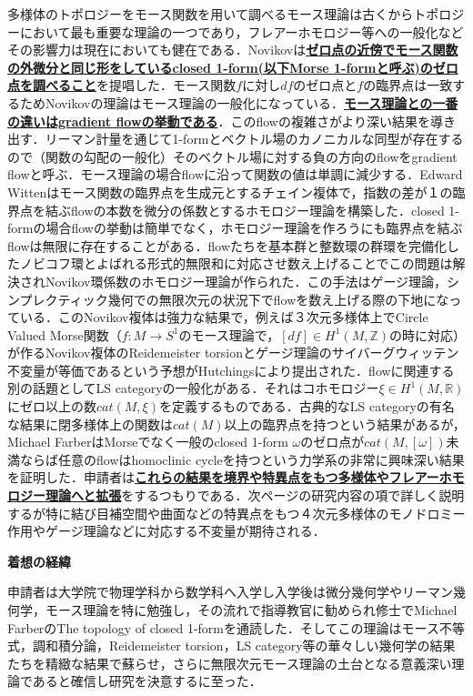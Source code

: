\documentclass[11pt,a4j,dvipdfmx]{jarticle} 					%
\newcommand{\研究課題名}{象の卵}
\newcommand{\研究機関名}{京都大学}
\newcommand{\研究代表者氏名}{福士謙二}
\begin{document}
	多様体のトポロジーをモース関数を用いて調べるモース理論は古くからトポロジーにおいて最も重要な理論の一つであり，フレアーホモロジー等への一般化などその影響力は現在においても健在である．Novikovは\textbf{\ul{ゼロ点の近傍でモース関数の外微分と同じ形をしているclosed 1-form(以下Morse 1-formと呼ぶ)のゼロ点を調べること}}を提唱した．モース関数$f$に対し$df$のゼロ点と$f$の臨界点は一致するためNovikovの理論はモース理論の一般化になっている．\textbf{\ul{モース理論との一番の違いはgradient flowの挙動である}}．このflowの複雑さがより深い結果を導き出す．リーマン計量を通じて1-formとベクトル場のカノニカルな同型が存在するので（関数の勾配の一般化）そのベクトル場に対する負の方向のflowをgradient flowと呼ぶ．モース理論の場合flowに沿って関数の値は単調に減少する．Edward Wittenはモース関数の臨界点を生成元とするチェイン複体で，指数の差が１の臨界点を結ぶflowの本数を微分の係数とするホモロジー理論を構築した．closed 1-formの場合flowの挙動は簡単でなく，ホモロジー理論を作ろうにも臨界点を結ぶflowは無限に存在することがある．flowたちを基本群と整数環の群環を完備化したノビコフ環とよばれる形式的無限和に対応させ数え上げることでこの問題は解決されNovikov環係数のホモロジー理論が作られた．この手法はゲージ理論，シンプレクティック幾何での無限次元の状況下でflowを数え上げる際の下地になっている．このNovikov複体は強力な結果で，例えば３次元多様体上でCircle Valued Morse関数$（f:M \rightarrow S^1$のモース理論で，$[df]\in H^1(M,\mathbb{Z})$の時に対応）が作るNovikov複体のReidemeister torsionとゲージ理論のサイバーグウィッテン不変量が等価であるという予想がHutchingsにより提出された．flowに関連する別の話題としてLS categoryの一般化がある．それはコホモロジー$\xi \in H^1(M,\mathbb{R})$にゼロ以上の数$cat(M,\xi)$を定義するものである．古典的なLS categoryの有名な結果に閉多様体上の関数は$cat(M)$以上の臨界点を持つという結果があるが，Michael FarberはMorseでなく一般のclosed 1-form  $\omega$のゼロ点が$cat(M,[\omega])$未満ならば任意のflowはhomoclinic cycleを持つという力学系の非常に興味深い結果を証明した．申請者は\textbf{\ul{これらの結果を境界や特異点をもつ多様体やフレアーホモロジー理論へと拡張}}をするつもりである．次ページの研究内容の項で詳しく説明するが特に結び目補空間や曲面などの特異点をもつ４次元多様体のモノドロミー作用やゲージ理論などに対応する不変量が期待される．

\vspace{4mm}
\noindent\Large
	\textbf{着想の経緯}\normalsize
	\vspace{1mm}

	申請者は大学院で物理学科から数学科へ入学し入学後は微分幾何学やリーマン幾何学，モース理論を特に勉強し，その流れで指導教官に勧められ修士でMichael FarberのThe topology of closed 1-formを通読した．そしてこの理論はモース不等式，調和積分論，Reidemeister torsion，LS category等の華々しい幾何学の結果たちを精緻な結果で蘇らせ，さらに無限次元モース理論の土台となる意義深い理論であると確信し研究を決意するに至った．
\end{document}
